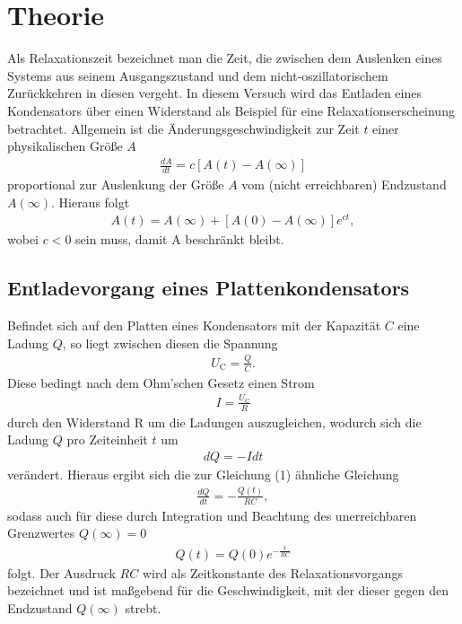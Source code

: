 \section{Theorie}
\label{sec:Theorie}

Als Relaxationszeit bezeichnet man die Zeit, die zwischen dem Auslenken eines Systems aus 
seinem Ausgangszustand und dem nicht-oszillatorischem Zurückkehren in diesen vergeht.
In diesem Versuch wird das Entladen eines Kondensators über einen Widerstand als 
Beispiel für eine Relaxationserscheinung betrachtet.
Allgemein ist die Änderungsgeschwindigkeit zur Zeit $t$ einer physikalischen Größe $A$
\begin{align}
\frac{dA}{dt} = c[A(t)-A(\infty)]
\end{align}
proportional zur Auslenkung der Größe $A$ vom (nicht erreichbaren) Endzustand $A(\infty)$.
Hieraus folgt
\begin{align}
A(t) = A(\infty)+[A(0) - A(\infty)]e^{ct},
\end{align}
wobei $c < 0$ sein muss, damit A beschränkt bleibt.

\subsection{Entladevorgang eines Plattenkondensators}
Befindet sich auf den Platten eines Kondensators mit der Kapazität $C$ eine Ladung $Q$, 
so liegt zwischen diesen die Spannung
\begin{align*}
U_\text{C} = \frac{Q}{C}.
\end{align*}
Diese bedingt nach dem Ohm'schen Gesetz einen Strom
\begin{align*}
I = \frac{U_\text{C}}{R}
\end{align*}
durch den Widerstand R um die Ladungen auszugleichen, wodurch sich die Ladung $Q$ 
pro Zeiteinheit $t$ um
\begin{align*}
dQ = -Idt
\end{align*}
verändert. Hieraus ergibt sich die zur Gleichung (1) ähnliche Gleichung
\begin{align}
\frac{dQ}{dt} = -\frac{Q(t)}{RC},
\end{align}
sodass auch für diese durch Integration und Beachtung des unerreichbaren Grenzwertes $Q(\infty) = 0$
\begin{align}
Q(t) = Q(0)e^{-\frac{t}{RC}}
\end{align}
folgt. Der Ausdruck $RC$ wird als Zeitkonstante des Relaxationsvorgangs bezeichnet und 
ist maßgebend für die Geschwindigkeit, mit der dieser gegen den Endzustand $Q(\infty)$ strebt.

